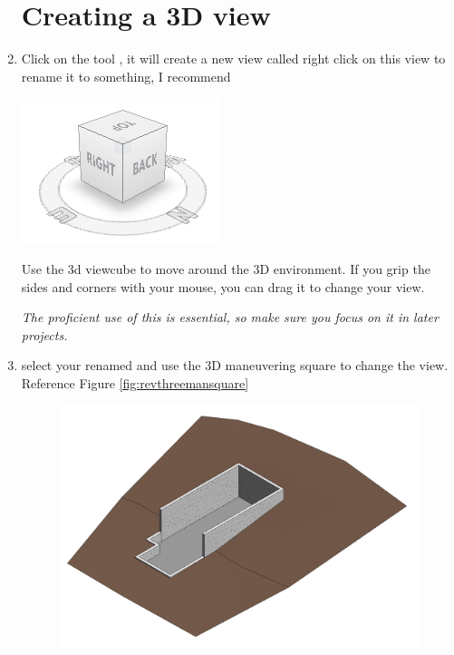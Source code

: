 \documentclass{tufte-book} %
\begin{document}
\begin{enumerate}
	\section{Creating a 3D view}
	\item Click on the tool , it will create a new view called  right click on this view to rename it to something, I recommend 
	\begin{marginfigure}
		\includegraphics[width=\linewidth]{revitthreedviewcube.png}
		\caption[Revit 3D Maneuvering Square]{Use the 3d viewcube to move around the 3D environment. If you grip the sides and corners with your mouse, you can drag it to change your view. }
		\emph{The proficient use of this is essential, so make sure you focus on it in later projects.}
		\label{fig:revthreemansquare}
	\end{marginfigure}
	\item select your renamed  and use the 3D maneuvering square to change the view. Reference Figure \ref{fig:revthreemansquare}
	\begin{figure}
		\includegraphics[width=\linewidth]{revitthreedtopographic.png}

\end{figure}
\end{enumerate}
\end{document}
